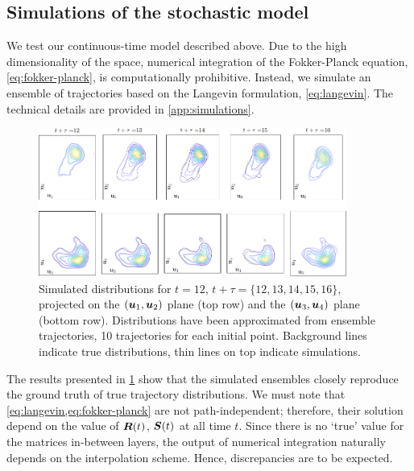 \documentclass{article} %
\begin{document}
\subsection{Simulations of the stochastic model}
We test our continuous-time model described above.
Due to the high dimensionality of the space, numerical integration of the Fokker-Planck equation, \cref{eq:fokker-planck}, is computationally prohibitive.
Instead, we simulate an ensemble of trajectories based on the Langevin formulation, \cref{eq:langevin}.
The technical details are provided in \cref{app:simulations}.

\begin{figure}[ht]
\vskip 0.2in
\begin{center}
\centerline{\includegraphics[width=0.9\textwidth]{fig/fig-simulations-v03.pdf}}
\caption{
Simulated distributions for $t=12$, $t+\tau = \{ 12, 13, 14, 15, 16\}$, projected on 
the $\left( {\bm{u}}_1,{\bm{u}}_2\right)$ plane (top row) and the $\left( {\bm{u}}_3,{\bm{u}}_4\right)$ plane (bottom row).
Distributions have been approximated from ensemble trajectories, 10 trajectories for each initial point. 
Background lines indicate true distributions, thin lines on top indicate simulations. 
}
\label{fig:simulations}
\end{center}
\vskip -0.2in
\end{figure}

The results presented in \cref{fig:simulations} show that the simulated ensembles closely reproduce the ground truth of true trajectory distributions. 
We must note that \cref{eq:langevin,eq:fokker-planck} are not path-independent; therefore, their solution depend on the value of ${\bm{R}}(t)$, ${\bm{S}}(t)$ at all time $t$. Since there is no `true' value for the matrices in-between layers, the output of numerical integration naturally depends on the interpolation scheme. Hence, discrepancies are to be expected. 
\end{document}
